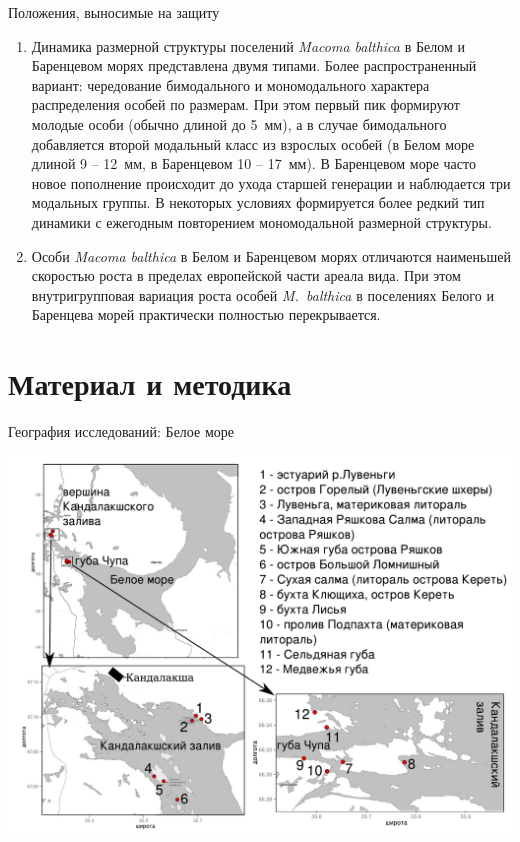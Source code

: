 \documentclass{beamer}
\begin{document}
\begin{frame}{Положения, выносимые на защиту}
\begin{scriptsize}
\begin{enumerate}
\addtocounter{enumi}{2}
\item Динамика размерной структуры поселений {\it Macoma balthica} в Белом и Баренцевом морях представлена двумя типами. 
Более распространенный вариант: чередование бимодального и мономодального характера распределения особей по размерам. 
При этом первый пик формируют молодые особи (обычно длиной до 5~мм), а в случае бимодального добавляется второй модальный класс из взрослых особей (в Белом море длиной 9 -- 12~мм, в Баренцевом 10 -- 17~мм). 
В Баренцевом море часто новое пополнение происходит до ухода старшей генерации и наблюдается три модальных группы.
В некоторых условиях формируется более редкий тип динамики с ежегодным повторением мономодальной размерной структуры. 

\item Особи {\it Macoma balthica} в Белом и Баренцевом морях отличаются наименьшей скоростью роста в пределах европейской части ареала вида. 
При этом внутригрупповая вариация роста особей \textit{M.~balthica} в поселениях Белого и Баренцева морей практически полностью перекрывается.
\end{enumerate}
\end{scriptsize}
\end{frame}


		\section[Методы]{Материал и методика}
\begin{frame}{География исследований: Белое море}
 \begin{center}
	\includegraphics[height=.8\textheight]{./White_sea.pdf}
 \end{center}
\end{frame}
\end{document}
